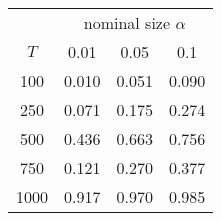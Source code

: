 % 
\begin{tabular}{cccc}
  \hline
  & \multicolumn{3}{c}{nominal size $\alpha$} \\
 $T$ & 0.01 & 0.05 & 0.1 \\
 \hline
100 & 0.010 & 0.051 & 0.090 \\ 
  250 & 0.071 & 0.175 & 0.274 \\ 
  500 & 0.436 & 0.663 & 0.756 \\ 
  750 & 0.121 & 0.270 & 0.377 \\ 
  1000 & 0.917 & 0.970 & 0.985 \\ 
   \hline
\end{tabular}
